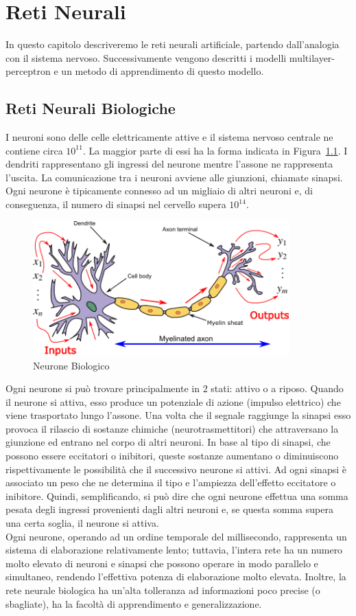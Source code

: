 \documentclass[11pt,a4paper,twoside,
openright]{book}
\begin{document}
\chapter{Reti Neurali}
In questo capitolo descriveremo le reti neurali artificiale, partendo dall'analogia con il sistema nervoso. Successivamente vengono descritti i modelli multilayer-perceptron e un metodo di apprendimento di questo modello.
\section{Reti Neurali Biologiche}
I neuroni sono delle celle elettricamente attive e il sistema nervoso centrale ne contiene circa $10^{11}$. La maggior parte di essi ha la forma indicata in Figura~\ref{fig:neurbio}. I dendriti rappresentano gli ingressi del neurone mentre l’assone ne rappresenta l’uscita. La comunicazione tra i neuroni avviene alle giunzioni, chiamate sinapsi. Ogni neurone è tipicamente connesso ad un migliaio di altri neuroni e, di conseguenza, il numero di sinapsi nel cervello supera $10^{14}$.
\begin{figure}[h!]
\begin{center}
\includegraphics[width=280pt]{BioNeuron.png}
\caption{Neurone Biologico~\cite{pict_neur}}
\end{center}
\label{fig:neurbio}
\end{figure}

Ogni neurone si può trovare principalmente in 2 stati: attivo o a riposo. Quando il neurone si attiva, esso produce un potenziale di azione (impulso elettrico) che viene trasportato lungo l’assone. Una volta che il segnale raggiunge la sinapsi esso provoca il rilascio di sostanze chimiche (neurotrasmettitori) che attraversano la giunzione ed entrano nel corpo di altri neuroni. In base al tipo di sinapsi, che possono essere eccitatori o inibitori, queste sostanze aumentano o diminuiscono rispettivamente le possibilità che il successivo neurone si attivi. Ad ogni sinapsi è associato un peso che ne determina il tipo e l’ampiezza dell’effetto eccitatore o inibitore. Quindi, semplificando, si può dire che ogni neurone effettua una somma pesata degli ingressi provenienti dagli altri neuroni e, se questa somma supera una certa soglia, il neurone si attiva.\\
Ogni neurone, operando ad un ordine temporale del millisecondo, rappresenta un sistema di elaborazione relativamente lento; tuttavia, l’intera rete ha un numero molto elevato di neuroni e sinapsi che possono operare in modo parallelo e simultaneo, rendendo l’effettiva potenza di elaborazione molto elevata. Inoltre, la rete neurale biologica ha un’alta tolleranza ad informazioni poco precise (o sbagliate), ha la facoltà di apprendimento e generalizzazione.
\end{document}

